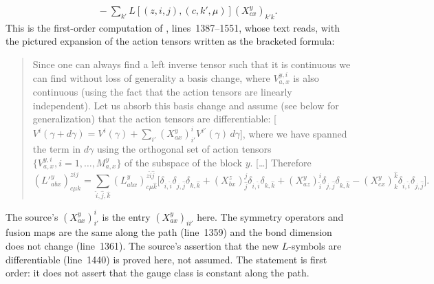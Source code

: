\begin{lemma}
\begin{align}
         & \quad-\sum_{k'}L[(z,i,j),(c,k',\mu)](X_{cx}^y)_{k'k}.
        \label{eq:glm_l_path_derivative}
    \end{align}
    This is the first-order computation of \cite[Section~5]{GarreRubio2023MPOSym},
    lines~1387--1551, whose text reads, with the pictured expansion of the
    action tensors written as the bracketed formula:
    \begin{quote}
        Since one can always find a left inverse tensor such that it is
        continuous we can find without loss of generality a basis change,
        where $V_{a,x}^{y,i}$ is also continuous (using the fact that the
        action tensors are linearly independent). Let us absorb this basis
        change and assume (see below for generalization) that the action
        tensors are differentiable:
        [$V^{i}(\gamma+d\gamma)=V^{i}(\gamma)
            +\sum_{i'}(X_{ax}^y)_{i'}^{i}V^{i'}(\gamma)\,d\gamma$], where we
        have spanned the term in $d\gamma$ using the orthogonal set of action
        tensors $\{V_{a,x}^{y,i},i=1,\ldots,M_{a,x}^y\}$ of the subspace of
        the block $y$. [\dots] Therefore
        \[
            ({L'}_{abx}^y)_{c\mu k}^{zij}=\sum_{\hat i,\hat j,\hat k}
            (L_{abx}^y)^{z\hat i\hat j}_{c\mu\hat k}\big[
                \delta_{i,\hat i}\delta_{j,\hat j}\delta_{k,\hat k}
                +(X_{bx}^z)_{\hat j}^{j}\delta_{i,\hat i}\delta_{k,\hat k}
                +(X_{az}^y)_{\hat i}^{i}\delta_{j,\hat j}\delta_{k,\hat k}
                -(X_{cx}^y)^{\hat k}_{k}\delta_{i,\hat i}\delta_{j,\hat j}\big].
        \]
    \end{quote}
    The source's $(X_{ax}^y)_{i'}^{i}$ is the entry $(X_{ax}^y)_{ii'}$ here.
    The symmetry operators and fusion maps are the same along the path
    (line~1359) and the bond dimension does not change (line~1361). The
    source's assertion that the new $L$-symbols are differentiable
    (line~1440) is proved here, not assumed. The statement is first order:
    it does not assert that the gauge class is constant along the path.
\end{lemma}

